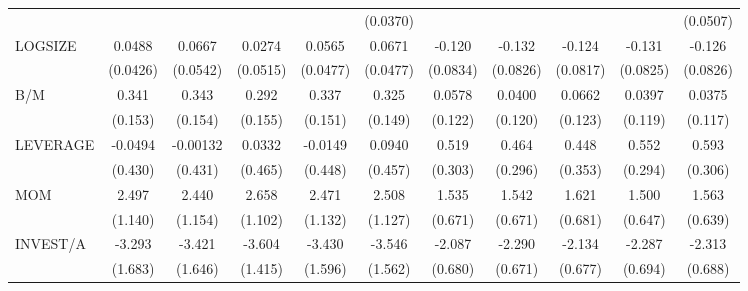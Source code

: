 \begin{table}[htbp]
\begin{tabular}{l*{10}{c}}
                &                  &                  &                  &                  & (0.0370)         &                  &                  &                  &                  & (0.0507)         \\
LOGSIZE         &   0.0488         &   0.0667         &   0.0274         &   0.0565         &   0.0671         &   -0.120         &   -0.132         &   -0.124         &   -0.131         &   -0.126         \\
                & (0.0426)         & (0.0542)         & (0.0515)         & (0.0477)         & (0.0477)         & (0.0834)         & (0.0826)         & (0.0817)         & (0.0825)         & (0.0826)         \\
B/M             &    0.341\sym{**} &    0.343\sym{**} &    0.292\sym{*}  &    0.337\sym{**} &    0.325\sym{**} &   0.0578         &   0.0400         &   0.0662         &   0.0397         &   0.0375         \\
                &  (0.153)         &  (0.154)         &  (0.155)         &  (0.151)         &  (0.149)         &  (0.122)         &  (0.120)         &  (0.123)         &  (0.119)         &  (0.117)         \\
LEVERAGE        &  -0.0494         & -0.00132         &   0.0332         &  -0.0149         &   0.0940         &    0.519\sym{*}  &    0.464         &    0.448         &    0.552\sym{*}  &    0.593\sym{*}  \\
                &  (0.430)         &  (0.431)         &  (0.465)         &  (0.448)         &  (0.457)         &  (0.303)         &  (0.296)         &  (0.353)         &  (0.294)         &  (0.306)         \\
MOM             &    2.497\sym{**} &    2.440\sym{**} &    2.658\sym{**} &    2.471\sym{**} &    2.508\sym{**} &    1.535\sym{**} &    1.542\sym{**} &    1.621\sym{**} &    1.500\sym{**} &    1.563\sym{**} \\
                &  (1.140)         &  (1.154)         &  (1.102)         &  (1.132)         &  (1.127)         &  (0.671)         &  (0.671)         &  (0.681)         &  (0.647)         &  (0.639)         \\
INVEST/A        &   -3.293\sym{*}  &   -3.421\sym{**} &   -3.604\sym{**} &   -3.430\sym{**} &   -3.546\sym{**} &   -2.087\sym{***}&   -2.290\sym{***}&   -2.134\sym{***}&   -2.287\sym{***}&   -2.313\sym{***}\\
                &  (1.683)         &  (1.646)         &  (1.415)         &  (1.596)         &  (1.562)         &  (0.680)         &  (0.671)         &  (0.677)         &  (0.694)         &  (0.688)         \\

\end{tabular}
\end{table}
